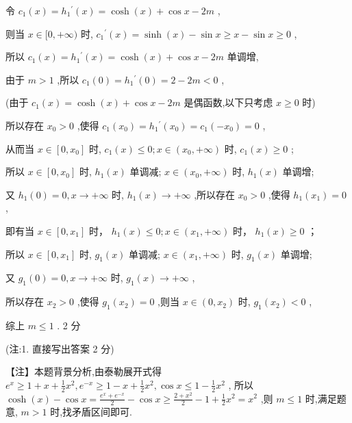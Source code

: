 \documentclass[10pt]{article}
\begin{document}
令 \({c}_{1}\left( x\right)  = {h}_{1}{}^{\prime }\left( x\right)  = \cosh \left( x\right)  + \cos x - {2m}\) ,

则当 \(x \in  \lbrack 0, + \infty )\) 时, \({c}_{1}{}^{\prime }\left( x\right)  = \sinh \left( x\right)  - \sin x \geq  x - \sin x \geq  0\) ,

所以 \({c}_{1}\left( x\right)  = {h}_{1}{}^{\prime }\left( x\right)  = \cosh \left( x\right)  + \cos x - {2m}\) 单调增,

由于 \(m > 1\) ,所以 \({c}_{1}\left( 0\right)  = {h}_{1}{}^{\prime }\left( 0\right)  = 2 - {2m} < 0\) ,

(由于 \({c}_{1}\left( x\right)  = \cosh \left( x\right)  + \cos x - {2m}\) 是偶函数,以下只考虑 \(x \geq  0\) 时)

所以存在 \({x}_{0} > 0\) ,使得 \({c}_{1}\left( {x}_{0}\right)  = {h}_{1}{}^{\prime }\left( {x}_{0}\right)  = {c}_{1}\left( {-{x}_{0}}\right)  = 0\) ,

从而当 \(x \in  \left\lbrack  {0,{x}_{0}}\right\rbrack\) 时, \({c}_{1}\left( x\right)  \leq  0;x \in  \left( {{x}_{0}, + \infty }\right)\) 时, \({c}_{1}\left( x\right)  \geq  0\) ;

所以 \(x \in  \left\lbrack  {0,{x}_{0}}\right\rbrack\) 时, \({h}_{1}\left( x\right)\) 单调减; \(x \in  \left( {{x}_{0}, + \infty }\right)\) 时, \({h}_{1}\left( x\right)\) 单调增;

又 \({h}_{1}\left( 0\right)  = 0,x \rightarrow   + \infty\) 时, \({h}_{1}\left( x\right)  \rightarrow   + \infty\) ,所以存在 \({x}_{0} > 0\) ,使得 \({h}_{1}\left( {x}_{1}\right)  = 0\) ,

即有当 \(x \in  \left\lbrack  {0,{x}_{1}}\right\rbrack\) 时， \({h}_{1}\left( x\right)  \leq  0;x \in  \left( {{x}_{1}, + \infty }\right)\) 时， \({h}_{1}\left( x\right)  \geq  0\) ；

所以 \(x \in  \left\lbrack  {0,{x}_{1}}\right\rbrack\) 时, \({g}_{1}\left( x\right)\) 单调减; \(x \in  \left( {{x}_{1}, + \infty }\right)\) 时, \({g}_{1}\left( x\right)\) 单调增;

又 \({g}_{1}\left( 0\right)  = 0,x \rightarrow   + \infty\) 时, \({g}_{1}\left( x\right)  \rightarrow   + \infty\) ,

所以存在 \({x}_{2} > 0\) ,使得 \({g}_{1}\left( {x}_{2}\right)  = 0\) ,则当 \(x \in  \left( {0,{x}_{2}}\right)\) 时, \({g}_{1}\left( {x}_{2}\right)  < 0\) ,

综上 \(m \leq  1\) . 2 分

(注:1. 直接写出答案 2 分)

【注】本题背景分析,由泰勒展开式得 \({e}^{x} \geq  1 + x + \frac{1}{2}{x}^{2},{e}^{-x} \geq  1 - x + \frac{1}{2}{x}^{2},\cos x \leq  1 - \frac{1}{2}{x}^{2}\) , 所以 \(\cosh \left( x\right)  - \cos x = \frac{{e}^{x} + {e}^{-x}}{2} - \cos x \geq  \frac{2 + {x}^{2}}{2} - 1 + \frac{1}{2}{x}^{2} = {x}^{2}\) ,则 \(m \leq  1\) 时,满足题意, \(m > 1\) 时,找矛盾区间即可.
\end{document}
